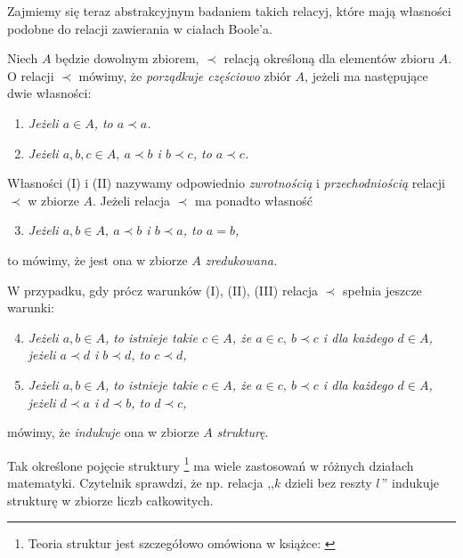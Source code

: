 \documentclass[12 pt, a4paper, leqno]{book}
\numberwithin{equation}{section}
\theoremstyle{twr}
\theoremstyle{twr}
\theoremstyle{eqtext}
\theoremstyle{okreslenie}
\begin{document}
Zajmiemy się teraz abstrakcyjnym badaniem takich relacyj, które mają własności podobne do relacji zawierania w ciałach Boole'a.

Niech $A$ będzie dowolnym zbiorem, $\prec$ relacją określoną dla elementów zbioru $A$. O relacji $\prec$ mówimy, że \textit{porządkuje częściowo} zbiór $A$, jeżeli
ma następujące dwie własności:
\begin{enumerate}[label=(\Roman{*}), wide=0pt, widest=99,leftmargin=*, labelsep=15pt, itemsep=0pt]
  \item \itshape Jeżeli $a \in A$, to $a \prec a$. \normalfont
  \item \itshape Jeżeli $a, b, c \in A,\ a \prec b$ i $b \prec c$, to $a \prec c$. \normalfont
\end{enumerate}

Własności (I) i (II) nazywamy odpowiednio \textit{zwrotnością} i \textit{przechodniością} relacji $\prec$ w zbiorze $A$. Jeżeli relacja $\prec$ ma ponadto własność 

\begin{enumerate}[label=(\Roman{*}), wide=0pt, widest=99,leftmargin=*, labelsep=15pt, itemsep=0pt]
\setcounter{enumi}{2}
  \item \itshape Jeżeli $a,b \in A,\ a \prec b$ i $b \prec a$, to $a = b$, \normalfont
\end{enumerate}
to mówimy, że jest ona w zbiorze $A$ \textit{zredukowana.}

W przypadku, gdy prócz warunków (I), (II), (III) relacja $\prec$ spełnia jeszcze warunki:
\begin{enumerate}[label=(\Roman{*}), wide=0pt, widest=99,leftmargin=*, labelsep=15pt, itemsep=0pt]
\setcounter{enumi}{3}
  \item \itshape Jeżeli $a, b \in A$, to istnieje takie $c \in A$, że $a \in c,\ b\prec c$ i dla każdego $d\in A$, jeżeli $a \prec d$ i $b\prec d$, to $c \prec d$, \normalfont
  \item \itshape Jeżeli $a, b \in A$, to istnieje takie $c \in A$, że $a \in c,\ b\prec c$ i dla każdego $d\in A$, jeżeli $d \prec a$ i $d \prec b$, to $d \prec c$, \normalfont 
\end{enumerate}
mówimy, że \textit{indukuje} ona w zbiorze $A$ \textit{strukturę}.

Tak określone pojęcie struktury \footnote{Teoria struktur jest szczegółowo omówiona w książce: \cite{birkhoff1}} ma wiele zastosowań w różnych działach matematyki. Czytelnik sprawdzi, że np. relacja
,,$k$ dzieli bez reszty $l\,$'' indukuje strukturę w zbiorze liczb całkowitych.
\end{document}
